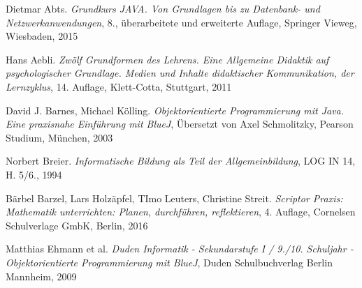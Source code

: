 \begin{thebibliography}{ABCDEF}

\renewcommand{\refname}{\normalsize Literaturverzeichnis}


Dietmar Abts. \emph{Grundkurs JAVA. Von Grundlagen bis zu Datenbank- und Netzwerkanwendungen}, 8., überarbeitete und erweiterte Auflage, Springer Vieweg, Wiesbaden, 2015

Hans Aebli. \emph{Zwölf Grundformen des Lehrens. Eine Allgemeine Didaktik auf psychologischer Grundlage. Medien und Inhalte didaktischer Kommunikation, der Lernzyklus}, 14. Auflage, Klett-Cotta, Stuttgart, 2011

David J. Barnes, Michael Kölling. \emph{Objektorientierte Programmierung mit Java. Eine praxisnahe Einführung mit BlueJ}, Übersetzt von Axel Schmolitzky, Pearson Studium, München, 2003

Norbert Breier. \emph{Informatische Bildung als Teil der Allgemeinbildung}, LOG IN 14, H. 5/6., 1994

Bärbel Barzel, Lars Holzäpfel, TImo Leuters, Christine Streit. \emph{Scriptor Praxis: Mathematik unterrichten: Planen, durchführen, reflektieren}, 4. Auflage, Cornelsen Schulverlage GmbK, Berlin, 2016




Matthias Ehmann et al. \emph{Duden Informatik - Sekundarstufe I / 9./10. Schuljahr - Objektorientierte Programmierung mit BlueJ}, Duden Schulbuchverlag Berlin Mannheim, 2009


\end{thebibliography}
